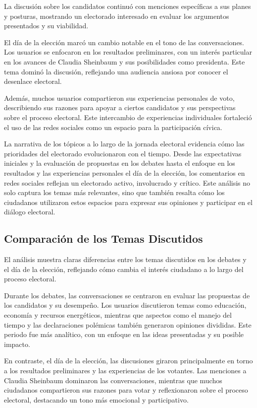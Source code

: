 \documentclass[10pt, a4paper]{article}
\begin{document}
	La discusión sobre los candidatos continuó con menciones específicas a sus planes y posturas, mostrando un electorado interesado en evaluar los argumentos presentados y su viabilidad.
	
	El día de la elección marcó un cambio notable en el tono de las conversaciones. Los usuarios se enfocaron en los resultados preliminares, con un interés particular en los avances de Claudia Sheinbaum y sus posibilidades como presidenta. Este tema dominó la discusión, reflejando una audiencia ansiosa por conocer el desenlace electoral.
	
	Además, muchos usuarios compartieron sus experiencias personales de voto, describiendo sus razones para apoyar a ciertos candidatos y sus perspectivas sobre el proceso electoral. Este intercambio de experiencias individuales fortaleció el uso de las redes sociales como un espacio para la participación cívica.
	
	La narrativa de los tópicos a lo largo de la jornada electoral evidencia cómo las prioridades del electorado evolucionaron con el tiempo. Desde las expectativas iniciales y la evaluación de propuestas en los debates hasta el enfoque en los resultados y las experiencias personales el día de la elección, los comentarios en redes sociales reflejan un electorado activo, involucrado y crítico. Este análisis no solo captura los temas más relevantes, sino que también resalta cómo los ciudadanos utilizaron estos espacios para expresar sus opiniones y participar en el diálogo electoral.
	
	\subsection{Comparación de los Temas Discutidos}
	
	El análisis muestra claras diferencias entre los temas discutidos en los debates y el día de la elección, reflejando cómo cambia el interés ciudadano a lo largo del proceso electoral.

	Durante los debates, las conversaciones se centraron en evaluar las propuestas de los candidatos y su desempeño. Los usuarios discutieron temas como educación, economía y recursos energéticos, mientras que aspectos como el manejo del tiempo y las declaraciones polémicas también generaron opiniones divididas. Este periodo fue más analítico, con un enfoque en las ideas presentadas y su posible impacto.
	
	En contraste, el día de la elección, las discusiones giraron principalmente en torno a los resultados preliminares y las experiencias de los votantes. Las menciones a Claudia Sheinbaum dominaron las conversaciones, mientras que muchos ciudadanos compartieron sus razones para votar y reflexionaron sobre el proceso electoral, destacando un tono más emocional y participativo.
	
\end{document}
